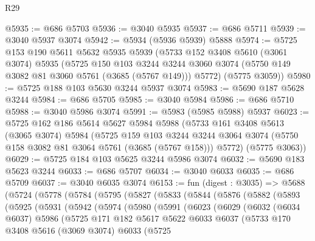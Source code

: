 \begin{lexlean}{R29}
\begin{coremodule}
@5935 := @686 @5703
@5936 := @3040 @5935
@5937 := @686 @5711
@5939 := @3040 @5937 @3074
@5942 := @5934 (@5936 @5939) @5888
@5974 := @5725
    @153
    @190
    @5611
    @5632
    @5935
    @5939
    (@5733
      @152
      @3408
      @5610
      (@3061 @3074)
      @5935
      (@5725
        @150
        @103
        @3244
        @3244
        @3060
        @3074
        (@5750 @149 @3082 @81 @3060 @5761 (@3685 (@5767 @149)))
        @5772)
      (@5775 @3059))
@5980 := @5725 @188 @103 @5630 @3244 @5937 @3074
@5983 := @5690 @187 @5628 @3244
@5984 := @686 @5705
@5985 := @3040 @5984
@5986 := @686 @5710
@5988 := @3040 @5986 @3074
@5991 := @5983 (@5985 @5988) @5937
@6023 := @5725
    @162
    @186
    @5614
    @5627
    @5984
    @5988
    (@5733
      @161
      @3408
      @5613
      (@3065 @3074)
      @5984
      (@5725
        @159
        @103
        @3244
        @3244
        @3064
        @3074
        (@5750 @158 @3082 @81 @3064 @5761 (@3685 (@5767 @158)))
        @5772)
      (@5775 @3063))
@6029 := @5725 @184 @103 @5625 @3244 @5986 @3074
@6032 := @5690 @183 @5623 @3244
@6033 := @686 @5707
@6034 := @3040 @6033
@6035 := @686 @5709
@6037 := @3040 @6035 @3074
@6153 := fun (digest : @3035) =>
  @5688
    (@5724
      (@5778
        (@5784
          (@5795
            (@5827
              (@5833
                (@5844
                  (@5876
                    (@5882
                      (@5893
                        (@5925
                          (@5931
                            (@5942
                              (@5974
                                (@5980
                                  (@5991
                                    (@6023
                                      (@6029
                                        (@6032
                                          (@6034 @6037)
                                          @5986
                                          (@5725
                                            @171
                                            @182
                                            @5617
                                            @5622
                                            @6033
                                            @6037
                                            (@5733
                                              @170
                                              @3408
                                              @5616
                                              (@3069 @3074)
                                              @6033
                                              (@5725

\end{coremodule}
\end{lexlean}
